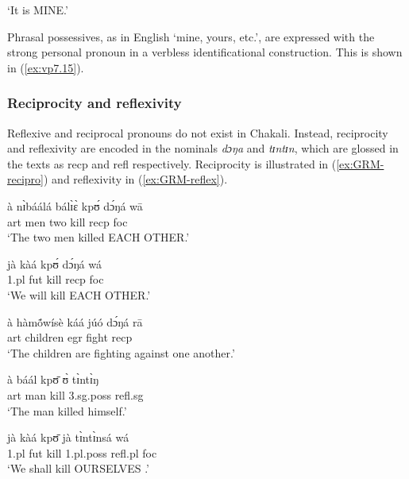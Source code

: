 \begin{exe}
\begin{exe}
\begin{exe}
{\begin{exe}
\begin{exe}
\begin{exe}
\begin{exe}
\begin{exe}
\begin{exe}
\begin{exe}
\begin{xlist}
\begin{exe}
\glt  `It is MINE.' 
\z


Phrasal possessives, as in English `mine, yours, etc.', are expressed with the
strong personal pronoun  in a verbless identificational
construction. This is shown in (\ref{ex:vp7.15}).




\subsubsection{Reciprocity and reflexivity}
\label{sec:GRM-recipro-reflex}


Reflexive and reciprocal pronouns do not exist in Chakali.  Instead,
reciprocity and reflexivity  are
encoded in  the nominals {\it dɔŋa}   and {\it tɪntɪn}, which are glossed in 
the
texts as {\sc recp}  and {\sc refl} respectively.   Reciprocity is illustrated 
in
(\ref{ex:GRM-recipro}) and reflexivity in (\ref{ex:GRM-reflex}). 



  \ea\label{ex:GRM-recipro}
   
   
\ea\label{ex:vp24.1.}
\gll à nɪ̀báálá bálɪ̀ɛ̀ kpʊ́ dɔ́ŋá wā \\
     {\sc art} men two kill    {\sc recp}  {\sc foc} \\
\glt  `The two men killed EACH OTHER.' 

\ex\label{ex:vp24.2.}
\gll jà kàá kpʊ́ dɔ́ŋá wá \\
      {\sc 1.pl} {\sc fut} kill  {\sc recp}   {\sc foc} \\
\glt  `We will kill  EACH OTHER.' 

\ex\label{ex:vp24.3.}
\gll à hàmṍwísè káá júó dɔ́ŋá rā \\
     {\sc art} children {\sc  egr} fight {\sc recp}   \\
\glt  `The children are fighting against one another.' 
 
   
  \z 
 \z



 \ea\label{ex:GRM-reflex}
  
   
\ea\label{ex:vp25.1.}
\gll  à báál kpʊ̄ ʊ̀ tɪ̀ntɪ̀ŋ \\
      {\sc art} man kill  {\sc 3.sg.poss} {\sc refl.sg} \\
\glt  `The man killed himself.' 

\ex\label{ex:vp25.2.}
\gll jà kàá kpʊ̄ jà tɪ̀ntɪ̀nsá wá \\
     {\sc 1.pl}  {\sc fut} kill {\sc 1.pl.poss}  {\sc refl.pl} {\sc foc} \\
\glt  `We shall kill OURSELVES  .'


\end{exe}
\end{xlist}
\end{exe}
\end{exe}
\end{exe}
\end{exe}
\end{exe}
\end{exe}
\end{exe}}
\end{exe}
\end{exe}
\end{exe}
